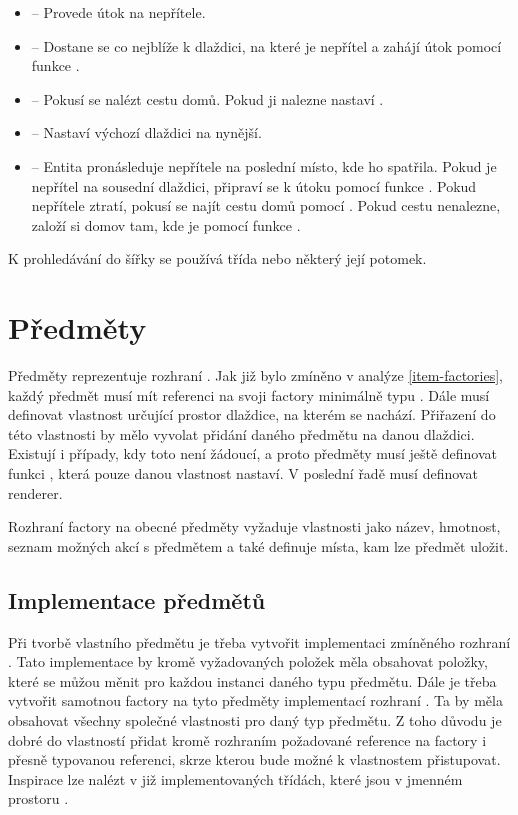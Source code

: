 \begin{itemize}
\item {} -- Provede útok na nepřítele.

\item {} -- Dostane se co nejblíže k dlaždici, na které je nepřítel a zahájí útok pomocí funkce .

\item {} -- Pokusí se nalézt cestu domů. Pokud ji nalezne nastaví .

\item {} -- Nastaví výchozí dlaždici na nynější.

\item {} -- Entita pronásleduje nepřítele na poslední místo, kde ho spatřila. Pokud je nepřítel na sousední dlaždici, připraví
se k útoku pomocí funkce . Pokud nepřítele ztratí, pokusí se najít cestu domů pomocí . Pokud
cestu nenalezne, založí si domov tam, kde je pomocí funkce .

\end{itemize}

K prohledávání do šířky se používá třída  nebo některý její potomek. 

\section{Předměty}
Předměty reprezentuje rozhraní . Jak již bylo zmíněno v analýze \vref{item-factories}, každý předmět musí mít referenci na svoji 
factory minimálně typu . Dále musí definovat vlastnost  určující prostor dlaždice, na kterém se nachází. 
Přiřazení do této vlastnosti by mělo vyvolat přidání daného předmětu na danou dlaždici. Existují i případy, kdy toto není 
žádoucí, a proto předměty musí ještě definovat funkci , která pouze danou vlastnost nastaví. V poslední řadě musí definovat renderer.

Rozhraní factory na obecné předměty vyžaduje vlastnosti jako název, hmotnost, seznam 
možných akcí s předmětem a také definuje místa, kam lze předmět uložit.

\subsection{Implementace předmětů}
Při tvorbě vlastního předmětu je třeba vytvořit implementaci zmíněného rozhraní . Tato implementace by 
kromě vyžadovaných položek měla obsahovat položky, které se můžou měnit pro každou instanci daného typu předmětu. 
Dále je třeba vytvořit samotnou factory na tyto předměty implementací rozhraní .
Ta by měla obsahovat všechny společné vlastnosti pro daný typ předmětu. Z toho  důvodu je dobré do vlastností 
přidat kromě rozhraním požadované reference na factory i přesně typovanou referenci, skrze kterou bude možné k 
vlastnostem přistupovat. Inspirace lze nalézt v již implementovaných třídách, které jsou v jmenném 
prostoru .

